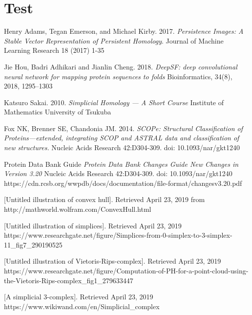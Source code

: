 \documentclass[12pt, a4paper, twocolumn, fullpage]{article}
\theoremstyle{plain}
\theoremstyle{definition}
\theoremstyle{remark}
\begin{document}
\pagebreak
\pagebreak
\section*{Test}
\begin{thebibliography}{9}
Henry Adams, Tegan Emerson, and Michael Kirby. 
2017.
\textit{Persistence Images: A Stable Vector Representation of
Persistent Homology}. 
Journal of Machine Learning Research 18 (2017) 1-35

Jie Hou, Badri Adhikari and Jianlin Cheng.
2018.
\textit{DeepSF: deep convolutional neural network for mapping protein sequences to folds}
Bioinformatics, 34(8), 2018, 1295–1303

Katsuro Sakai.
2010.
\textit{Simplicial Homology — A Short Course}
Institute of Mathematics University of Tsukuba

Fox NK, Brenner SE, Chandonia JM.
2014.
\textit{SCOPe: Structural Classification of Proteins—extended, integrating SCOP and ASTRAL data and classification of new structures.}
Nucleic Acids Research 42:D304-309. doi: 10.1093/nar/gkt1240


Protein Data Bank Guide
\textit{Protein Data Bank Changes Guide
    New Changes in Version 3.20}
Nucleic Acids Research 42:D304-309. doi: 10.1093/nar/gkt1240
https://cdn.rcsb.org/wwpdb/docs/documentation/file-format/changesv3.20.pdf

[Untitled illustration of convex hull]. Retrieved April 23, 2019
             from http://mathworld.wolfram.com/ConvexHull.html
             
[Untitled illustration of simplices]. Retrieved April 23, 2019
https://www.researchgate.net/figure/Simplices-from-0-simplex-to-3-simplex-11\_fig7\_290190525

[Untitled illustration of Vietoris-Rips-complex]. Retrieved April 23, 2019
https://www.researchgate.net/figure/Computation-of-PH-for-a-point-cloud-using-the-Vietoris-Rips-complex\_fig1\_279633447

[A simplicial 3-complex]. Retrieved April 23, 2019 https://www.wikiwand.com/en/Simplicial\_complex

\end{thebibliography}
\end{document}
